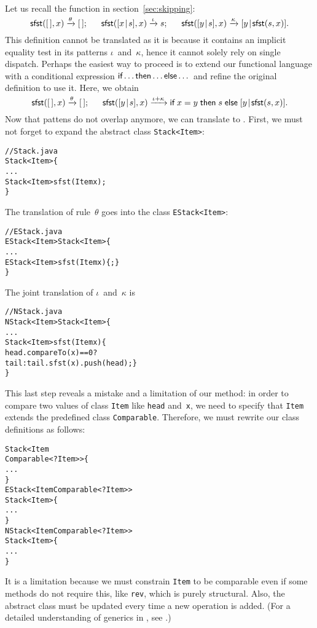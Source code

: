 Let us recall the function  in
section~\vref{sec:skipping}:
\begin{equation*}
\textsf{sfst}([\,],x)          \xrightarrow{\smash{\theta}} [\,];\quad\;\;
\textsf{sfst}([{x}\!\mid\!{s}],x)  \xrightarrow{\smash{\iota}}  s;\quad\;\;
\textsf{sfst}([{y}\!\mid\!{s}],x)  \xrightarrow{\smash{\kappa}}
                                         [{y}\!\mid\!{\textsf{sfst}(s,x)}].
\end{equation*}
This definition cannot be translated as it is because it contains an
implicit equality test in its patterns \(\iota\)~and~\(\kappa\), hence
it cannot solely rely on single dispatch. Perhaps the easiest way to
proceed is to extend our functional language with a conditional
expression \(\textsf{if} \dots \textsf{then} \dots \textsf{else} \dots\) and
refine the original definition to use it. Here, we obtain
\begin{equation*}
\textsf{sfst}([\,],x)          \xrightarrow{\smash{\theta}} [\,];\quad\;\;
\textsf{sfst}([{y}\!\mid\!{s}],x)  \xrightarrow{\smash{\iota+\kappa}}
\textsf{if} \; x = y \; \textsf{then} \; s \;
\textsf{else} \; [{y}\!\mid\!{\textsf{sfst}(s,x)}].
\end{equation*}
Now that pattens do not overlap anymore, we can translate to
\Java. First, we must not forget to expand the abstract class
\texttt{Stack<Item>}:
\begin{alltt}
// Stack.java
\public \abstractX \class Stack<Item> \{
  ...
  \public \abstractX Stack<Item> sfst(\final Item x);
\}
\end{alltt}
The translation of rule~\(\theta\) goes into the class
\texttt{EStack<Item>}:
\begin{alltt}
// EStack.java
\public \final \class EStack<Item> \extends Stack<Item> \{
  ...
  \public EStack<Item> sfst(\final Item x) \{ \return \this; \}
\}
\end{alltt}
The joint translation of \(\iota\)~and~\(\kappa\) is
\begin{alltt}
// NStack.java
\public \final \class NStack<Item> \extends Stack<Item> \{
  ...
  \public Stack<Item> sfst(\final Item x) \{
    \return head.compareTo(x) == 0 ?
           tail : tail.sfst(x).push(head); \}
\}
\end{alltt}
This last step reveals a mistake and a limitation of our method: in
order to compare two values of class \texttt{Item} like \texttt{head}
and~\texttt{x}, we need to specify that \texttt{Item} extends the
predefined class \texttt{Comparable}. Therefore, we must rewrite our
class definitions as follows:
\begin{alltt}
\public \abstractX \class Stack<Item
\hfill\extends Comparable<? \super Item>> \{
  ...
\}
\public \class EStack<Item \extends Comparable<? \super Item>> 
       \extends Stack<Item> \{
  ...
\}
\public \class NStack<Item \extends Comparable<? \super Item>>
       \extends Stack<Item> \{
  ...
\}
\end{alltt}
It is a limitation because we must constrain \texttt{Item} to be
comparable even if some methods do not require this, like
\texttt{rev}, which is purely structural. Also, the abstract class
must be updated every time a new operation is added. (For a detailed
understanding of generics in \Java, see \cite{NaftalinWadler_2006}.)


